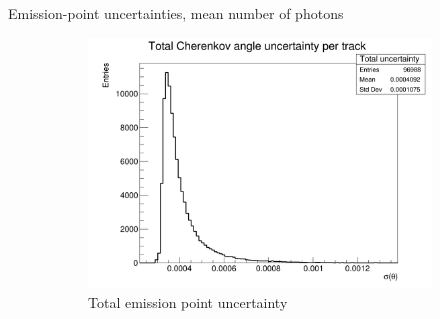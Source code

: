 \documentclass{beamer}
\begin{document}
\begin{frame}{Emission-point uncertainties, mean number of photons}
\begin{figure}
    \begin{subfigure}{0.35\textwidth}
      \includegraphics[width = 1.0\textwidth]{Plots/TotalCherenkovUncertainty.png}
      \caption{Total emission point uncertainty}
    \end{subfigure}
    \caption{}
  \end{figure}
\end{frame}
\end{document}

